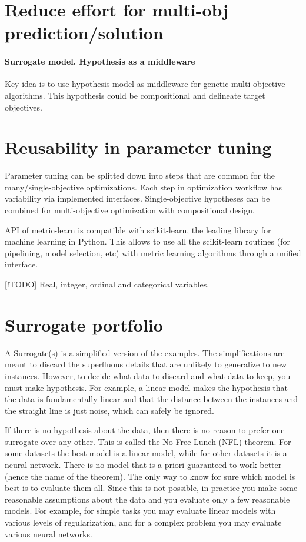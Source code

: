     \section{Reduce effort for multi-obj prediction/solution}
        \paragraph{Surrogate model. Hypothesis as a middleware}
        Key idea is to use hypothesis model as middleware for genetic multi-objective algorithms.
        This hypothesis could be compositional and delineate target objectives. 

    \section{Reusability in parameter tuning}
        Parameter tuning can be splitted down into steps that are common for the many/single-objective optimizations. 
        Each step in optimization workflow has variability via implemented interfaces.
        Single-objective hypotheses can be combined for multi-objective optimization with compositional design.

        API of metric-learn is compatible with scikit-learn, the leading library for machine learning in Python. 
        This allows to use all the scikit-learn routines (for pipelining, model selection, etc) with metric learning algorithms through a unified interface.

        [!TODO] Real, integer, ordinal and categorical variables.

    \section{Surrogate portfolio}
        A Surrogate(s) is a simplified version of the examples. The simplifications are meant to discard the superfluous details that are unlikely to generalize to new instances. 
        However, to decide what data to discard and what data to keep, you must make hypothesis. 
        For example, a linear model makes the hypothesis that the data is fundamentally linear and that the distance between the instances and the straight line is just noise, 
        which can safely be ignored.

        If there is no hypothesis about the data, then there is no reason to prefer one surrogate over any other. This is called the No Free Lunch (NFL) theorem. For some datasets the best
        model is a linear model, while for other datasets it is a neural network. There is no model that is a priori guaranteed to work better (hence the name of the theorem). 
        The only way to know for sure which model is best is to evaluate them all. Since this is not possible, in practice you make some reasonable assumptions about the data 
        and you evaluate only a few reasonable models. For example, for simple tasks you may evaluate linear models with various levels of regularization, 
        and for a complex problem you may evaluate various neural networks.

